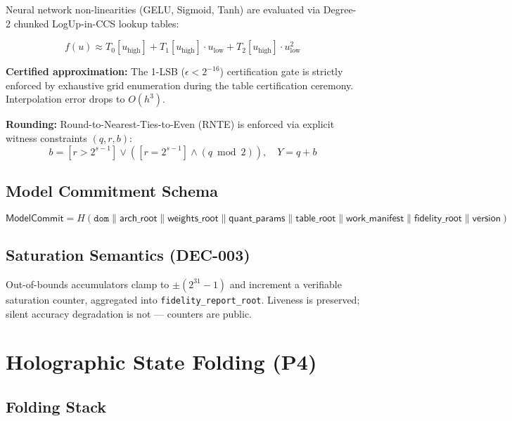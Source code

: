 \documentclass[11pt, a4paper]{article}
\begin{document}
Neural network non-linearities (GELU, Sigmoid, Tanh) are evaluated via Degree-2 chunked LogUp-in-CCS lookup tables:

\begin{equation}
f(u) \approx T_0[u_{\text{high}}] + T_1[u_{\text{high}}] \cdot u_{\text{low}} + T_2[u_{\text{high}}] \cdot u_{\text{low}}^2
\end{equation}

\textbf{Certified approximation:} The 1-LSB ($\epsilon < 2^{-16}$) certification gate is strictly enforced by exhaustive grid enumeration during the table certification ceremony. Interpolation error drops to $O(h^3)$.

\textbf{Rounding:} Round-to-Nearest-Ties-to-Even (RNTE) is enforced via explicit witness constraints $(q, r, b)$:
\begin{equation}
b = [r > 2^{s-1}] \vee ([r = 2^{s-1}] \wedge (q \bmod 2)), \quad Y = q + b
\end{equation}

\subsection{Model Commitment Schema}

\begin{equation}
\textsf{ModelCommit} = H(\texttt{dom} \| \textsf{arch\_root} \| \textsf{weights\_root} \| \textsf{quant\_params} \| \textsf{table\_root} \| \textsf{work\_manifest} \| \textsf{fidelity\_root} \| \textsf{version})
\end{equation}

\subsection{Saturation Semantics (DEC-003)}

Out-of-bounds accumulators clamp to $\pm(2^{31}-1)$ and increment a verifiable saturation counter, aggregated into \texttt{fidelity\_report\_root}. Liveness is preserved; silent accuracy degradation is not --- counters are public.

\section{Holographic State Folding (P4)}

\subsection{Folding Stack}
\end{document}

